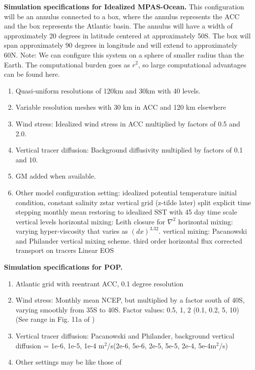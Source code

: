 \documentclass[12pt,letterpaper]{article}
\begin{document}
{\bf Simulation specifications for Idealized MPAS-Ocean.} This configuration will be an annulus connected to a box, where the annulus represents the ACC and the box represents the Atlantic basin. The annulus will have a width of approximately 20 degrees in latitude centered at approximately 50S. The box will span approximately 90 degrees in longitude and will extend to approximately 60N. Note: We can configure this system on a sphere of smaller radius than the Earth. The computational burden goes as $r^2$, so large computational advantages can be found here.
\begin{enumerate}
\item Quasi-uniform resolutions of 120km and 30km with 40 levels.
\item Variable resolution meshes with 30 km in ACC and 120 km elsewhere
\item Wind stress: Idealized wind stress in ACC multiplied by factors of 0.5 and 2.0.
\item Vertical tracer diffusion: Background diffusivity multiplied by factors of 0.1 and 10.
\item GM added when available.
\item Other model configuration setting: 
\subitem idealized potential temperature initial condition, constant salinity
\subitem zstar vertical grid (z-tilde later)
\subitem split explicit time stepping
\subitem monthly mean restoring to idealized SST with 45 day time scale
 vertical levels
\subitem horizontal mixing: Leith closure for $\nabla^2$
\subitem horizontal mixing: varying hyper-viscosity that varies as $(dx)^{3.32}$.
\subitem vertical mixing: Pacanowski and Philander vertical mixing scheme.
\subitem third order horizontal flux corrected transport on tracers
\subitem Linear EOS
\end{enumerate}

{\bf Simulation specifications for POP.}
\begin{enumerate}
\item Atlantic grid with reentrant ACC, 0.1 degree resolution
\item Wind stress: Monthly mean NCEP, but multiplied by a factor south of 40S, varying smoothly from 35S to 40S.  Factor values: 0.5, 1, 2 (0.1, 0.2, 5, 10) (See range in Fig. 11a of \cite{Nikurashin_Vallis12jpo})
\item Vertical tracer diffusion: Pacanowski and Philander, background vertical diffusion = 1e-6, 1e-5, 1e-4 m$^2$/s(2e-6, 5e-6, 2e-5, 5e-5, 2e-4, 5e-4m$^2$/s)
\item Other settings may be like those of \cite{Maltrud_McClean05om}
\end{enumerate}
\end{document}
